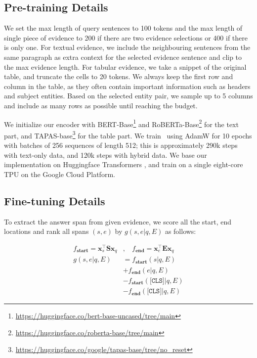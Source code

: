 \documentclass[11pt]{article}
\newcommand{\revise}[1]{#1}
\newcommand{\nop}[1]{}
\newcommand{\ours}[0]{\text{ReasonBERT}}
\begin{document}
\subsection{Pre-training Details}
\label{sec:pretrain_detail}
We set the max length of query sentences to 100 tokens and the max length of \nop{each evidence sample}\revise{single piece of evidence} to 200 if there are two evidence selections or 400 if there is only one. For textual evidence, we include the neighbouring sentences from the same paragraph as extra context for the selected evidence sentence and clip to the max evidence length. For tabular evidence, we take a snippet of the original table, and truncate the cells to 20 tokens. We always keep the first row and column in the table, as they often contain important information such as headers and subject entities. Based on the selected entity pair, we sample up to 5 columns and include as many rows as possible until reaching the budget.

We initialize {our encoder} with BERT-Base\footnote{\url{https://huggingface.co/bert-base-uncased/tree/main}} and RoBERTa-Base\footnote{\url{https://huggingface.co/roberta-base/tree/main}} for the text part\nop{-only setting}, and TAPAS-base\footnote{\url{https://huggingface.co/google/tapas-base/tree/no_reset}} for the table part\nop{hybrid setting}. We train \ours\ using AdamW \cite{Loshchilov2019DecoupledWD} for 10 epochs with batches of 256 sequences of length 512; this is approximately 290k steps with text-only data, and 120k steps with hybrid data. We base our implementation on Huggingface Transformers \cite{wolf-etal-2020-transformers}, and train on a single eight-core TPU on the Google Cloud Platform.

\subsection{Fine-tuning Details}
\label{sec:finetune_detail}
To extract the answer span from given evidence, we score all the start, end locations and rank all spans $(s,e)$ by $g(s,e|q,E)$ as follows:

{\small{\begin{align}
    f_\mathbf{start} = \mathbf{x}_{s}^{\top} \mathbf{S} \mathbf{x}_{q}&,\ \ \ \ f_\mathbf{end} = \mathbf{x}_{e}^{\top} \mathbf{E} \mathbf{x}_{q} \label{eqn:score_0}\\
    g(s,e|q,E)&= f_\mathbf{start}(s|q,E)\label{eqn:score_1}\\
    &+f_\mathbf{end}(e|q,E) \nonumber\\
    &-f_\mathbf{start}(\texttt{[CLS]}|q,E) \nonumber\\
    &-f_\mathbf{end}(\texttt{[CLS]}|q,E) \nonumber
\end{align}}}
\end{document}
